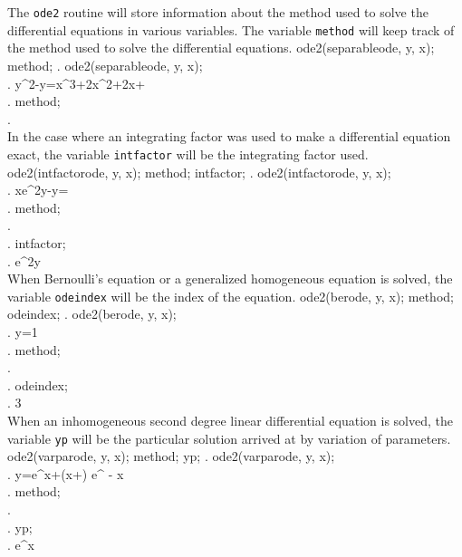 \documentclass{article}
\begin{document}
The \texttt{ode2} routine will store information about the method used
to solve the differential equations in various variables.
The variable \texttt{method} will keep track of the method used to
solve the differential equations.
\beginmaximasession
ode2(separableode, y, x);
method;
\maximatexsession
{}.  ode2(separableode, y, x); \\
.   y^{2}-y=x^{3}+2\*x^{2}+2\*x+ \\
.  method; \\
.    \\
\endmaximasession
\noindent
In the case where an integrating factor was used to make a
differential equation exact, the variable \texttt{intfactor} will be
the integrating factor used.
\beginmaximasession
ode2(intfactorode, y, x);
method;
intfactor;
\maximatexsession
{}.  ode2(intfactorode, y, x); \\
.   x\*e^{2\*y}-\log y= \\
.  method; \\
.    \\
.  intfactor; \\
.   {{e^{2\*y}}} \\
\endmaximasession
\noindent
When Bernoulli's equation or a generalized homogeneous equation is
solved, the variable \texttt{odeindex} will be the index of the
equation.
\beginmaximasession
ode2(berode, y, x);
method;
odeindex;
\maximatexsession
{}.  ode2(berode, y, x); \\
.   y={{1}} \\
.  method; \\
.    \\
.  odeindex; \\
.   3 \\
\endmaximasession
\noindent
When an inhomogeneous second degree linear differential equation is
solved, the variable \texttt{yp} will be the particular solution
arrived at by variation of parameters.
\beginmaximasession
ode2(varparode, y, x);
method;
yp;
\maximatexsession
{}.  ode2(varparode, y, x); \\
.   y={{e^{x}}}+\left(\*x+\right)
 \*e^ {- x } \\
.  method; \\
.    \\
.  yp; \\
.   {{e^{x}}} \\
\endmaximasession
\end{document}
